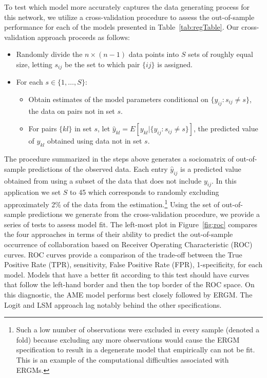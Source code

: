 To test which model more accurately captures the data generating process for this network, we utilize a cross-validation procedure to assess the out-of-sample performance for each of the models presented in Table~\ref{tab:regTable}. Our cross-validation approach proceeds as follows:

\begin{itemize}
	\item Randomly divide the $n \times (n-1)$ data points into $S$ sets of roughly equal size, letting $s_{ij}$ be the set to which pair $\{ij\}$ is assigned.
	\item For each $s \in \{1, \ldots, S\}$:
	\begin{itemize}
		\item Obtain estimates of the model parameters conditional on $\{y_{ij} : s_{ij} \neq s\}$, the data on pairs not in set $s$.
		\item For pairs $\{kl\}$ in set $s$, let $\hat y_{kl} = E[y_{kl} | \{y_{ij} : s_{ij} \neq s\}]$, the predicted value of $y_{kl}$ obtained using data not in set $s$.
	\end{itemize}
\end{itemize}

The procedure summarized in the steps above generates a sociomatrix of out-of-sample predictions of the observed data. Each entry $\hat y_{ij}$ is a predicted value obtained from using a subset of the data that does not include $y_{ij}$. In this application we set $S$ to 45 which corresponds to randomly excluding approximately 2\% of the data from the estimation.\footnote{Such a low number of observations were excluded in every sample (denoted a fold) because excluding any more observations would cause the ERGM specification to result in a degenerate model that empirically can not be fit. This is an example of the computational difficulties associated with ERGMs.} Using the set of out-of-sample predictions we generate from the cross-validation procedure, we provide a series of tests to assess model fit. The left-most plot in Figure~\ref{fig:roc} compares the four approaches in terms of their ability to predict the out-of-sample occurrence of collaboration based on Receiver Operating Characteristic (ROC) curves. ROC curves provide a comparison of the trade-off between the True Positive Rate (TPR), sensitivity, False Positive Rate (FPR), 1-specificity, for each model. Models that have a better fit according to this test should have curves that follow the left-hand border and then the top border of the ROC space. On this diagnostic, the AME model performs best closely followed by ERGM. The Logit and LSM approach lag notably behind the other specifications. 

